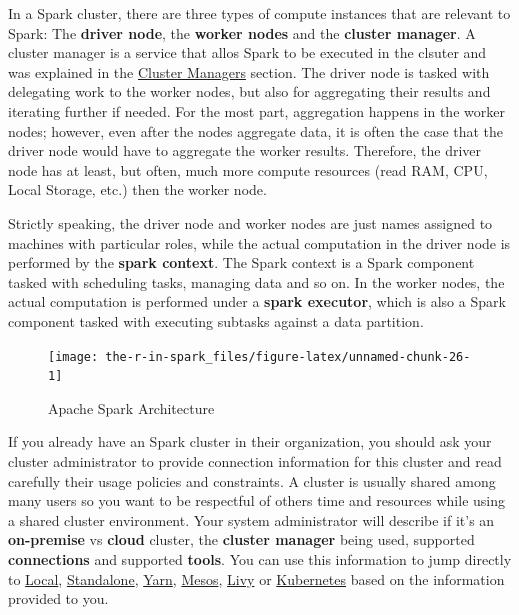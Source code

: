 \documentclass[]{book}
\theoremstyle{definition}
\theoremstyle{definition}
\theoremstyle{definition}
\theoremstyle{remark}
\begin{document}
In a Spark cluster, there are three types of compute instances that are
relevant to Spark: The \textbf{driver node}, the \textbf{worker nodes}
and the \textbf{cluster manager}. A cluster manager is a service that
allos Spark to be executed in the clsuter and was explained in the
\href{Managers}{Cluster Managers} section. The driver node is tasked
with delegating work to the worker nodes, but also for aggregating their
results and iterating further if needed. For the most part, aggregation
happens in the worker nodes; however, even after the nodes aggregate
data, it is often the case that the driver node would have to aggregate
the worker results. Therefore, the driver node has at least, but often,
much more compute resources (read RAM, CPU, Local Storage, etc.) then
the worker node.

Strictly speaking, the driver node and worker nodes are just names
assigned to machines with particular roles, while the actual computation
in the driver node is performed by the \textbf{spark context}. The Spark
context is a Spark component tasked with scheduling tasks, managing data
and so on. In the worker nodes, the actual computation is performed
under a \textbf{spark executor}, which is also a Spark component tasked
with executing subtasks against a data partition.

\begin{figure}

{\centering \texttt{[image: the-r-in-spark\_files/figure-latex/unnamed-chunk-26-1]} 

}

\caption{Apache Spark Architecture}\label{fig:unnamed-chunk-26}
\end{figure}

If you already have an Spark cluster in their organization, you should
ask your cluster administrator to provide connection information for
this cluster and read carefully their usage policies and constraints. A
cluster is usually shared among many users so you want to be respectful
of others time and resources while using a shared cluster environment.
Your system administrator will describe if it's an \textbf{on-premise}
vs \textbf{cloud} cluster, the \textbf{cluster manager} being used,
supported \textbf{connections} and supported \textbf{tools}. You can use
this information to jump directly to \protect\hyperlink{local}{Local},
\protect\hyperlink{standalone}{Standalone},
\protect\hyperlink{yarn-1}{Yarn}, \protect\hyperlink{mesos-1}{Mesos},
\protect\hyperlink{livy}{Livy} or
\protect\hyperlink{kubernetes-1}{Kubernetes} based on the information
provided to you.
\end{document}
